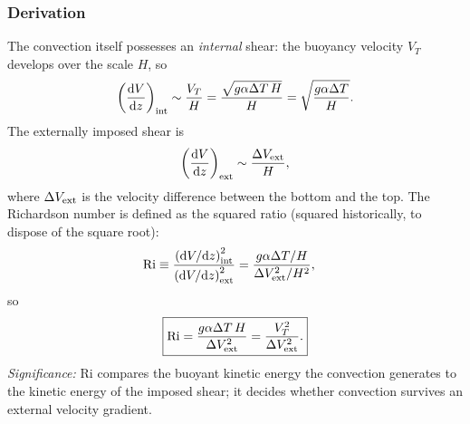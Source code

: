 \subsubsection*{Derivation}
The convection itself possesses an \emph{internal} shear: the buoyancy
velocity $V_T$ develops over the scale $H$, so
\begin{equation}
    \left(\dv{V}{z}\right)_{\rm int}
    \sim\frac{V_T}{H}
    =\frac{\sqrt{g\alpha\Delta T\,H}}{H}
    =\sqrt{\frac{g\alpha\Delta T}{H}}.
    \label{eq:lec09:internal-shear}
\end{equation}
The externally imposed shear is
\begin{equation}
    \left(\dv{V}{z}\right)_{\rm ext}
    \sim\frac{\Delta V_{\rm ext}}{H},
    \label{eq:lec09:external-shear}
\end{equation}
where $\Delta V_{\rm ext}$ is the velocity difference between the bottom and
the top. The Richardson number is defined as the squared ratio (squared
historically, to dispose of the square root):
\begin{align}
    \mathrm{Ri}
    &\equiv
    \frac{\left(\dd V/\dd z\right)_{\rm int}^2}
         {\left(\dd V/\dd z\right)_{\rm ext}^2}
    =
    \frac{g\alpha\Delta T/H}{\Delta V_{\rm ext}^2/H^2},
    \label{eq:lec09:richardson-step}
\end{align}
so
\begin{equation}
    \boxed{
    \mathrm{Ri}
    =
    \frac{g\alpha\Delta T\,H}{\Delta V_{\rm ext}^2}
    =
    \frac{V_T^2}{\Delta V_{\rm ext}^2}.
    }
    \label{eq:lec09:richardson}
\end{equation}
\textit{Significance:} $\mathrm{Ri}$ compares the buoyant kinetic energy the
convection generates to the kinetic energy of the imposed shear; it decides
whether convection survives an external velocity gradient.


